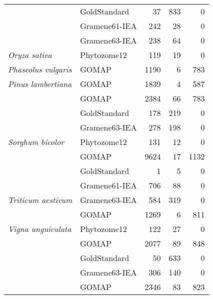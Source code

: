 \documentclass[utf8]{frontiersSCNS}
\begin{document}
\begin{table}[t]
{\begin{threeparttable}
\begin{tabular}{llrrr}
\rowcolor{gray!6}   & GoldStandard & 37 & 833 & 0\\

 & Gramene61-IEA & 242 & 28 & 0\\

\rowcolor{gray!6}   & Gramene63-IEA & 238 & 64 & 0\\

\multirow{-5}{*}{\raggedright\arraybackslash \textit{Oryza sativa}} & Phytozome12 & 119 & 19 & 0\\
\cmidrule{1-5}
\rowcolor{gray!6}  \textit{Phaseolus vulgaris} & GOMAP & 1190 & 6 & 783\\
\cmidrule{1-5}
\textit{Pinus lambertiana} & GOMAP & 1839 & 4 & 587\\
\cmidrule{1-5}
\rowcolor{gray!6}   & GOMAP & 2384 & 66 & 783\\

 & GoldStandard & 178 & 219 & 0\\

\rowcolor{gray!6}   & Gramene63-IEA & 278 & 198 & 0\\

\multirow{-4}{*}{\raggedright\arraybackslash \textit{Sorghum bicolor}} & Phytozome12 & 131 & 12 & 0\\
\cmidrule{1-5}
\rowcolor{gray!6}   & GOMAP & 9624 & 17 & 1132\\

 & GoldStandard & 1 & 5 & 0\\

\rowcolor{gray!6}   & Gramene61-IEA & 706 & 88 & 0\\

\multirow{-4}{*}{\raggedright\arraybackslash \textit{Triticum aestivum}} & Gramene63-IEA & 584 & 319 & 0\\
\cmidrule{1-5}
\rowcolor{gray!6}   & GOMAP & 1269 & 6 & 811\\

\multirow{-2}{*}{\raggedright\arraybackslash \textit{Vigna unguiculata}} & Phytozome12 & 122 & 27 & 0\\
\cmidrule{1-5}
\rowcolor{gray!6}   & GOMAP & 2077 & 89 & 848\\

 & GoldStandard & 50 & 633 & 0\\

\rowcolor{gray!6}  \multirow{-3}{*}{\raggedright\arraybackslash \textit{Zea mays} B73.v4} & Gramene63-IEA & 306 & 140 & 0\\
\cmidrule{1-5}
 & GOMAP & 2346 & 83 & 823\\


\end{tabular}
\end{threeparttable}}
\end{table}
\end{document}

